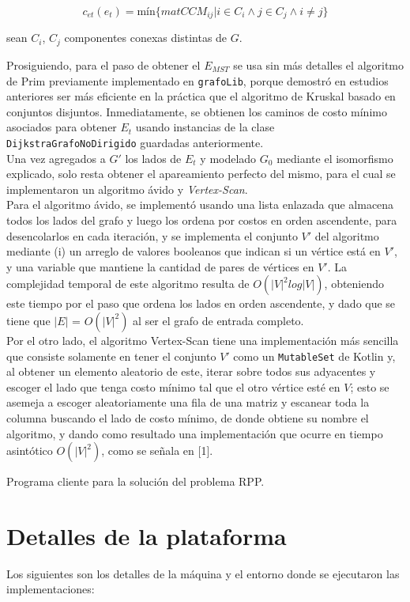 \documentclass[11pt]{article}
\begin{document}
\[
   c_{et}(e_t) = \text{mín}\{matCCM_{ij} | i \in C_i \land j \in C_j \land i \neq j \}
\]

sean $C_i$, $C_j$ componentes conexas distintas de $G$.

Prosiguiendo, para el paso de obtener el $E_{MST}$ se usa sin más detalles el algoritmo
de Prim previamente implementado en \texttt{grafoLib}, porque demostró en estudios
anteriores ser más eficiente en la práctica que el algoritmo de Kruskal basado en
conjuntos disjuntos. Inmediatamente, se obtienen los caminos de costo mínimo asociados
para obtener $E_t$ usando instancias de la clase \texttt{DijkstraGrafoNoDirigido} guardadas
anteriormente. \\

Una vez agregados a $G'$ los lados de $E_t$ y modelado $G_0$ mediante el isomorfismo 
explicado, solo resta obtener el apareamiento perfecto del mismo, para el cual se
implementaron un algoritmo ávido y \emph{Vertex-Scan}. \\

Para el algoritmo ávido, se implementó usando una lista enlazada que almacena todos
los lados del grafo y luego los ordena por costos en orden ascendente, para
desencolarlos en cada iteración, y se implementa el conjunto $V'$ del
algoritmo mediante (i) un arreglo de valores booleanos que indican si un 
vértice está en $V'$, y una variable que mantiene la cantidad de pares de vértices
en $V'$. La complejidad temporal de este algoritmo resulta de $O(|V|^2log|V|)$,
obteniendo este tiempo por el paso que ordena los lados en orden ascendente, y
dado que se tiene que $|E|$ = $O(|V|^2)$ al ser el grafo de entrada completo. \\

Por el otro lado, el algoritmo Vertex-Scan tiene una implementación más
sencilla que consiste solamente en tener el conjunto $V'$ como un \texttt{MutableSet}
de Kotlin y, al obtener un elemento aleatorio de este, iterar sobre todos sus adyacentes
y escoger el lado que tenga costo mínimo tal que el otro vértice esté en $V$; esto se 
asemeja a escoger aleatoriamente una fila de una matriz y escanear toda la columna
buscando el lado de costo mínimo, de donde obtiene su nombre el algoritmo, y dando 
como resultado una implementación que ocurre en tiempo asintótico $O(|V|^2)$, como
se señala en [1].

Programa cliente para la solución del problema RPP.\\


\section{Detalles de la plataforma}
Los siguientes son los detalles de la máquina y el entorno donde se ejecutaron las implementaciones:
\end{document}
